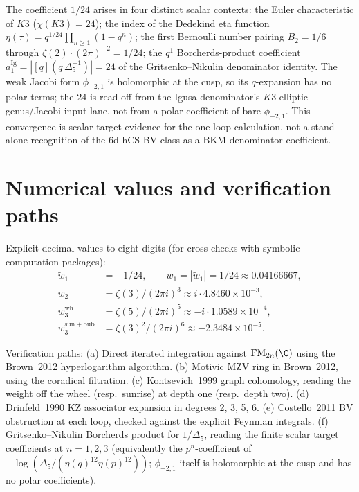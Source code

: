 \begin{remark}
\label{rem:one-loop-eta-K3}
The coefficient $1/24$ arises in four distinct scalar
contexts: the Euler characteristic of $K3$ ($\chi(K3) = 24$); the
index of the Dedekind eta function
$\eta(\tau) = q^{1/24}\prod_{n\geq 1}(1 - q^n)$; the first
Bernoulli number pairing $B_2 = 1/6$ through
$\zeta(2)\cdot (2\pi)^{-2} = 1/24$; the $q^{1}$ Borcherds-product
coefficient $a_1^{\mathrm{Ig}}=|[q](q\,\Delta_5^{-1})|=24$ of the
Gritsenko--Nikulin denominator identity. The weak Jacobi form
$\phi_{-2,1}$ is holomorphic at the cusp, so its $q$-expansion has no
polar terms; the $24$ is read off from the Igusa denominator's
$K3$ elliptic-genus/Jacobi input lane, not from a polar coefficient of
bare $\phi_{-2,1}$. This convergence is scalar target evidence for the
one-loop calculation, not a stand-alone recognition of the 6d hCS BV
class as a BKM denominator coefficient.
\end{remark}

\section{Numerical values and verification paths}
\label{sec:numerics}

Explicit decimal values to eight digits (for cross-checks with
symbolic-computation packages):
\begin{align*}
\widetilde w_1 &= -1/24,\qquad w_1=|\widetilde w_1|=1/24
\approx 0.04166667, \\
w_2 &= \zeta(3)/(2\pi i)^3 \approx i\cdot 4.8460\times 10^{-3}, \\
w_3^{\mathrm{wh}} &= \zeta(5)/(2\pi i)^5 \approx -i\cdot 1.0589\times 10^{-4}, \\
w_3^{\mathrm{sun+bub}} &= \zeta(3)^2/(2\pi i)^6 \approx
-2.3484\times 10^{-5}.
\end{align*}

Verification paths:
(a) Direct iterated integration against $\FM_{2n}(\C)$ using the
Brown~2012 hyperlogarithm algorithm.
(b) Motivic MZV ring in Brown~2012, using the coradical filtration.
(c) Kontsevich~1999 graph cohomology, reading the weight off the
wheel (resp.\ sunrise) at depth one (resp.\ depth two).
(d) Drinfeld~1990 KZ associator expansion in degrees 2, 3, 5, 6.
(e) Costello~2011 BV obstruction at each loop, checked against the
explicit Feynman integrals.
(f) Gritsenko--Nikulin Borcherds product for $1/\Delta_5$,
reading the finite scalar target coefficients at $n = 1, 2, 3$
(equivalently the $p^{n}$-coefficient of
$-\log(\Delta_5/(\eta(q)^{12}\eta(p)^{12}))$; $\phi_{-2,1}$ itself is holomorphic
at the cusp and has no polar coefficients).

